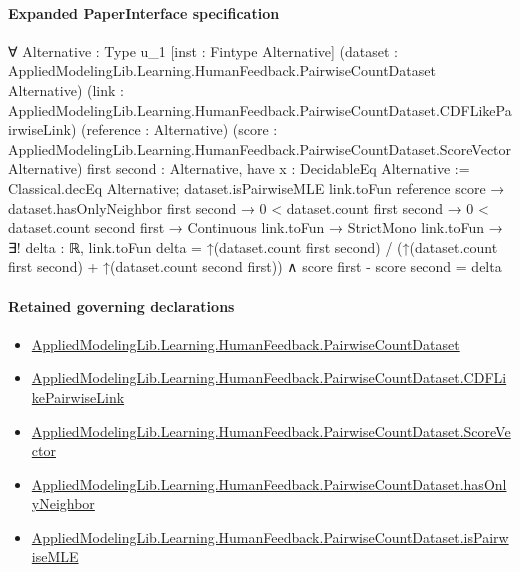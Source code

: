 \documentclass[10pt]{article}
\begin{document}
\paragraph{Expanded PaperInterface specification}
\begin{ReviewVerbatim}
∀ {Alternative : Type u_1} [inst : Fintype Alternative]
  (dataset : AppliedModelingLib.Learning.HumanFeedback.PairwiseCountDataset Alternative)
  (link : AppliedModelingLib.Learning.HumanFeedback.PairwiseCountDataset.CDFLikePairwiseLink) (reference : Alternative)
  (score : AppliedModelingLib.Learning.HumanFeedback.PairwiseCountDataset.ScoreVector Alternative)
  {first second : Alternative},
  have x : DecidableEq Alternative := Classical.decEq Alternative;
  dataset.isPairwiseMLE link.toFun reference score →
    dataset.hasOnlyNeighbor first second →
      0 < dataset.count first second →
        0 < dataset.count second first →
          Continuous link.toFun →
            StrictMono link.toFun →
              ∃! delta : ℝ,
                link.toFun delta =
                    ↑(dataset.count first second) / (↑(dataset.count first second) + ↑(dataset.count second first)) ∧
                  score first - score second = delta
\end{ReviewVerbatim}

\paragraph{Retained governing declarations}
\begin{itemize}\raggedright
\item \hyperlink{governing-declaration-2ba23f394a8d08a2}{Applied\allowbreak{}Modeling\allowbreak{}Lib.\allowbreak{}Learning.\allowbreak{}Human\allowbreak{}Feedback.\allowbreak{}Pairwise\allowbreak{}Count\allowbreak{}Dataset}
\item \hyperlink{governing-declaration-3449f3559185d0fd}{Applied\allowbreak{}Modeling\allowbreak{}Lib.\allowbreak{}Learning.\allowbreak{}Human\allowbreak{}Feedback.\allowbreak{}Pairwise\allowbreak{}Count\allowbreak{}Dataset.\allowbreak{}CDF\allowbreak{}Like\allowbreak{}Pairwise\allowbreak{}Link}
\item \hyperlink{governing-declaration-87eda978eb1b0c9d}{Applied\allowbreak{}Modeling\allowbreak{}Lib.\allowbreak{}Learning.\allowbreak{}Human\allowbreak{}Feedback.\allowbreak{}Pairwise\allowbreak{}Count\allowbreak{}Dataset.\allowbreak{}Score\allowbreak{}Vector}
\item \hyperlink{governing-declaration-a631e734cd0a8407}{Applied\allowbreak{}Modeling\allowbreak{}Lib.\allowbreak{}Learning.\allowbreak{}Human\allowbreak{}Feedback.\allowbreak{}Pairwise\allowbreak{}Count\allowbreak{}Dataset.\allowbreak{}has\allowbreak{}Only\allowbreak{}Neighbor}
\item \hyperlink{governing-declaration-cba21d23e0e5aa10}{Applied\allowbreak{}Modeling\allowbreak{}Lib.\allowbreak{}Learning.\allowbreak{}Human\allowbreak{}Feedback.\allowbreak{}Pairwise\allowbreak{}Count\allowbreak{}Dataset.\allowbreak{}is\allowbreak{}Pairwise\allowbreak{}MLE}
\end{itemize}
\end{document}
